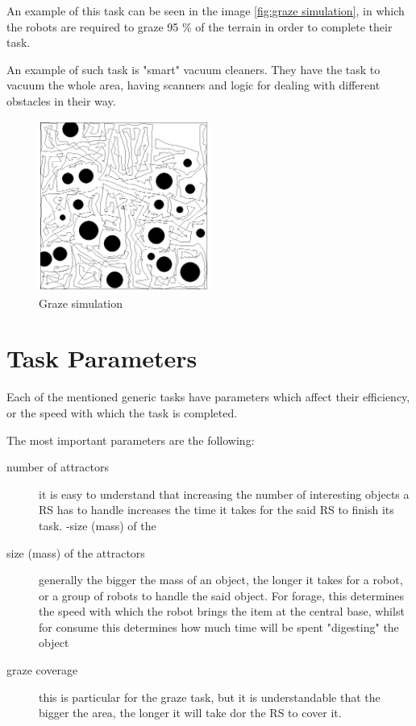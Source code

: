 \documentclass[12pt]{report}
\begin{document}
An example of this task can be seen in the image \autoref{fig:graze simulation}, in which the robots are required to graze 95 \% of the terrain in order to complete their task.

An example of such task is "smart" vacuum cleaners. They have the task to vacuum the whole area, having scanners and logic for dealing with different obstacles in their way.

\begin{figure}[h!]
\centering
\includegraphics[width=0.5\textwidth]{"3 graze simulation"}
\caption{Graze simulation}
\label{fig:graze simulation}
\end{figure}





\section{Task Parameters}

Each of the mentioned generic tasks have parameters which affect their efficiency, or the speed with which the task is completed.

The most important parameters are the following:

\begin{description}

\item [number of attractors] it is easy to understand that increasing the number of interesting objects a RS has to handle increases the time it takes for the said RS to finish its task.
-size (mass) of the 

\item [size (mass) of the attractors] generally the bigger the mass of an object, the longer it takes for a robot, or a group of robots to handle the said object. For forage, this determines the speed with which the robot brings  the item at the central base, whilst for consume this determines how much time will be spent "digesting" the object


\item [graze coverage] this is particular for the graze task, but it is understandable that the bigger the area, the longer it will take dor the RS to cover it.

\end{description}
\end{document}

